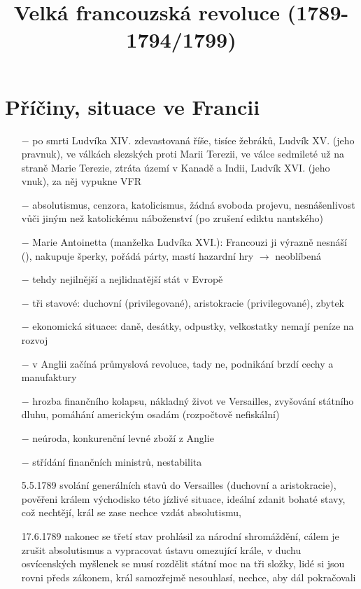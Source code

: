 \documentclass{article}
\title{\vspace{-2cm}Velká francouzská revoluce (1789-1794/1799)\vspace{-1.7cm}}
\date{}
\author{}
\begin{document}
\maketitle

\section*{Příčiny, situace ve Francii}

\begin{itemize}
    \vspace{-0.5em}
    \setlength\itemsep{0.15em}
    \item[$-$] po smrti Ludvíka XIV. zdevastovaná říše, tisíce žebráků, Ludvík XV. (jeho pravnuk), ve válkách slezských proti Marii Terezii, ve válce sedmileté už na straně Marie Terezie, ztráta území v Kanadě a Indii, Ludvík XVI. (jeho vnuk), za něj vypukne VFR
    \item[$-$] absolutismus, cenzora, katolicismus, žádná svoboda projevu, nesnášenlivost vůči jiným než katolickému náboženství (po zrušení ediktu nantského)
    \item[$-$] Marie Antoinetta (manželka Ludvíka XVI.): Francouzi ji výrazně nesnáší (), nakupuje šperky, pořádá párty, mastí hazardní hry $\rightarrow$ neoblíbená
    \item[$-$] tehdy nejilnější a nejlidnatější stát v Evropě
    \item[$-$] tři stavové: duchovní (privilegované), aristokracie (privilegované), zbytek
    \item[$-$] ekonomická situace: daně, desátky, odpustky, velkostatky nemají peníze na rozvoj
    \item[$-$] v Anglii začíná průmyslová revoluce, tady ne, podnikání brzdí cechy a manufaktury
    \item[$-$] hrozba finančního kolapsu, nákladný život ve Versailles, zvyšování státního dluhu, pomáhání americkým osadám (rozpočtově nefiskální)
    \item[$-$] neúroda, konkurenční levné zboží z Anglie
    \item[$-$] střídání finančních ministrů, nestabilita
    \item[5.5.1789] svolání generálních stavů do Versailles (duchovní a aristokracie), pověřeni králem východisko této jízlivé situace, ideální zdanit bohaté stavy, což nechtějí, král se zase nechce vzdát absolutismu,
    \item[17.6.1789] nakonec se třetí stav prohlásil za národní shromáždění, cálem je zrušit absolutismus a vypracovat ústavu omezující krále, v duchu osvícenských myšlenek se musí rozdělit státní moc na tři složky, lidé si jsou rovni předs zákonem, král samozřejmě nesouhlasí, nechce, aby dál pokračovali

\end{itemize}
\end{document}
